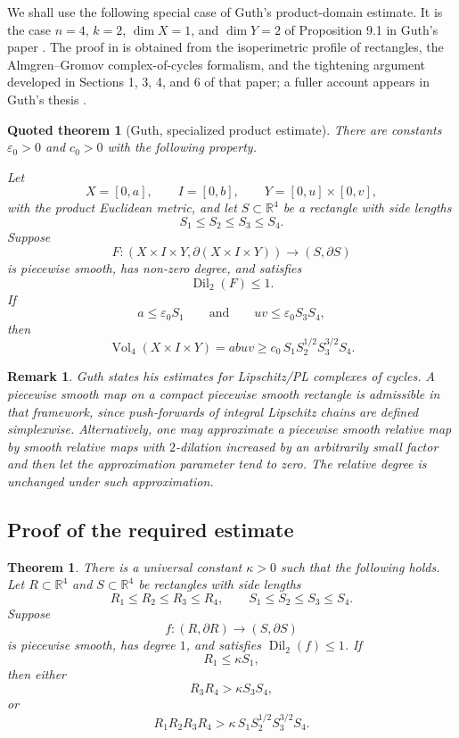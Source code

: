 \documentclass[12pt]{article}
\newtheorem{theorem}{Theorem}
\newtheorem{quotedtheorem}{Quoted theorem}
\newtheorem{remark}{Remark}
\newcommand{\R}{\mathbb{R}}
\newcommand{\Vol}{\operatorname{Vol}}
\newcommand{\Dil}{\operatorname{Dil}}
\begin{document}
We shall use the following special case of Guth's product-domain estimate.
It is the case \(n=4\), \(k=2\), \(\dim X=1\), and \(\dim Y=2\) of
Proposition 9.1 in Guth's paper \cite[Proposition 9.1]{GuthAreaExpanding}.
The proof in \cite{GuthAreaExpanding} is obtained from the isoperimetric
profile of rectangles, the Almgren--Gromov complex-of-cycles formalism,
and the tightening argument developed in Sections 1, 3, 4, and 6 of that
paper; a fuller account appears in Guth's thesis \cite{GuthThesis}.

\begin{quotedtheorem}[Guth, specialized product estimate]\label{qt:guth}
There are constants \(\varepsilon_0>0\) and \(c_0>0\) with the following
property.

Let
\[
X=[0,a],\qquad I=[0,b],\qquad Y=[0,u]\times[0,v],
\]
with the product Euclidean metric, and let \(S\subset \R^4\) be a rectangle
with side lengths
\[
S_1\leq S_2\leq S_3\leq S_4.
\]
Suppose
\[
F:(X\times I\times Y,\partial(X\times I\times Y))\longrightarrow
(S,\partial S)
\]
is piecewise smooth, has non-zero degree, and satisfies
\[
\Dil_2(F)\leq 1.
\]
If
\[
a\leq \varepsilon_0 S_1
\qquad\text{and}\qquad
uv\leq \varepsilon_0 S_3S_4,
\]
then
\[
\Vol_4(X\times I\times Y)
=abuv
\geq
c_0\,S_1S_2^{1/2}S_3^{3/2}S_4.
\]
\end{quotedtheorem}

\begin{remark}
Guth states his estimates for Lipschitz/PL complexes of cycles. A
piecewise smooth map on a compact piecewise smooth rectangle is admissible
in that framework, since push-forwards of integral Lipschitz chains are
defined simplexwise. Alternatively, one may approximate a piecewise smooth
relative map by smooth relative maps with \(2\)-dilation increased by an
arbitrarily small factor and then let the approximation parameter tend to
zero. The relative degree is unchanged under such approximation.
\end{remark}

\subsection{Proof of the required estimate}

\begin{theorem}\label{thm:main}
There is a universal constant \(\kappa>0\) such that the following holds.
Let \(R\subset \R^4\) and \(S\subset \R^4\) be rectangles with side lengths
\[
R_1\leq R_2\leq R_3\leq R_4,
\qquad
S_1\leq S_2\leq S_3\leq S_4.
\]
Suppose
\[
f:(R,\partial R)\longrightarrow (S,\partial S)
\]
is piecewise smooth, has degree \(1\), and satisfies \(\Dil_2(f)\leq 1\).
If
\[
R_1\leq \kappa S_1,
\]
then either
\[
R_3R_4>\kappa S_3S_4,
\]
or
\[
R_1R_2R_3R_4
>
\kappa\,S_1S_2^{1/2}S_3^{3/2}S_4.
\]
\end{theorem}
\end{document}

